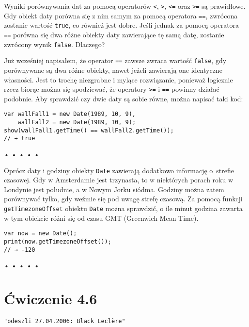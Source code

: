 Wyniki porównywania dat za pomocą operatorów \texttt{<}, \texttt{>}, \texttt{<=} oraz \texttt{>=} są prawidłowe. Gdy obiekt daty porówna się z nim samym za pomocą operatora \texttt{==}, zwrócona zostanie wartość \texttt{true}, co również jest dobre. Jeśli jednak za pomocą operatora \texttt{==}\index{==} porówna się dwa różne obiekty daty zawierające tę samą datę, zostanie zwrócony wynik \texttt{false}. Dlaczego?

    
Już wcześniej napisałem, że operator \texttt{==} zawsze zwraca wartość \texttt{false}, gdy porównywane są dwa różne obiekty, nawet jeżeli zawierają one identyczne własności. Jest to trochę niezgrabne i mylące rozwiązanie, ponieważ logicznie rzecz biorąc można się spodziewać, że operatory \texttt{>=} i \texttt{==} powinny działać podobnie. Aby sprawdzić czy dwie daty są sobie równe, można napisać taki kod:

    
\begin{verbatim} 
var wallFall1 = new Date(1989, 10, 9),
    wallFall2 = new Date(1989, 10, 9);
show(wallFall1.getTime() == wallFall2.getTime());
// → true
\end{verbatim}
  
  
\begin{center}
• • • • •
\end{center}
  
    
Oprócz daty i godziny obiekty \texttt{Date} zawierają dodatkowo informację o~strefie czasowej. Gdy w Amsterdamie jest trzynasta, to w niektórych porach roku w Londynie jest południe, a w Nowym Jorku siódma. Godziny można zatem porównywać tylko, gdy weźmie się pod uwagę strefę czasową. Za pomocą funkcji \texttt{getTimezoneOffset} obiektu \texttt{Date} można sprawdzić, o ile minut godzina zawarta w tym obiekcie różni się od czasu GMT (Greenwich Mean Time).

    
\begin{verbatim} 
var now = new Date();
print(now.getTimezoneOffset());
// → -120
\end{verbatim}
  
  
\begin{center}
• • • • •
\end{center}
  
    
\section*{Ćwiczenie 4.6}
\label{sec:4.6}
    
      
\begin{verbatim} 
"odeszli 27.04.2006: Black Leclère"
 \end{verbatim}
      
